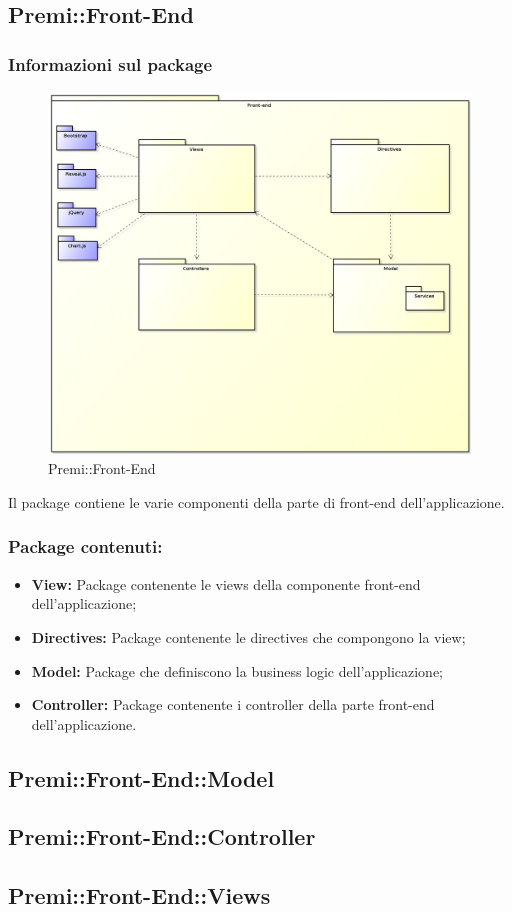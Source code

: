 \subsection{Premi::Front-End}
	\subsubsection*{Informazioni sul package}
		\begin{figure}[h]
			\centering
			\includegraphics[width=\linewidth]{img/front-end-package}
			\caption[Premi::Front-End]{Premi::Front-End}
		\end{figure}
		Il package contiene le varie componenti della parte di front-end dell'applicazione.

		\subsubsection*{Package contenuti:}
			\begin{itemize}
				\item \textbf{View:} Package contenente le views della componente front-end dell'applicazione;
				\item \textbf{Directives:} Package contenente le directives che compongono la view;
				\item \textbf{Model:} Package che definiscono la business logic dell'applicazione;
				\item \textbf{Controller:} Package contenente i controller della parte front-end dell'applicazione.
			\end{itemize}

		\subsection{Premi::Front-End::Model}
			

		\subsection{Premi::Front-End::Controller}
			

		\subsection{Premi::Front-End::Views}
			
